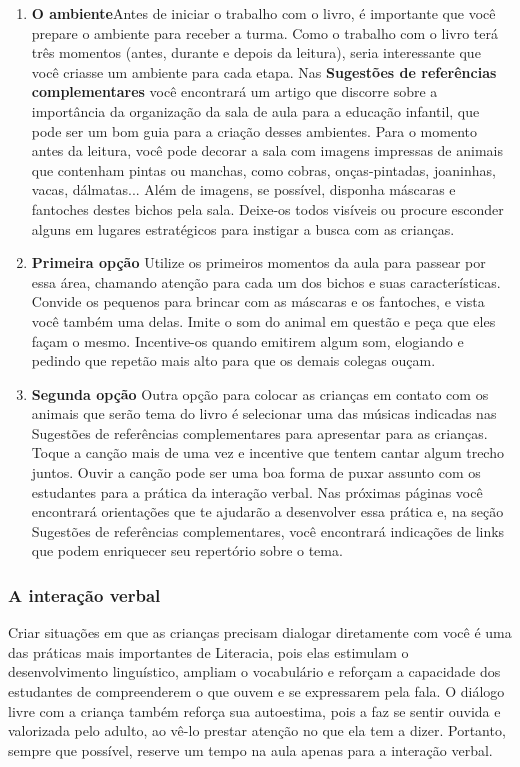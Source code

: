 \documentclass[11pt]{extarticle}
\begin{document}
\begin{enumerate}
\item \textbf{O ambiente}\quad Antes de iniciar o trabalho com o livro, é importante que você 
prepare o ambiente para receber a turma. Como o trabalho com o livro terá 
três momentos (antes, durante e depois da leitura), seria interessante que você 
criasse um ambiente para cada etapa. Nas \textbf{Sugestões de referências complementares} 
você encontrará um artigo que discorre sobre a importância da organização da sala 
de aula para a educação infantil, que pode ser um bom guia para a criação desses 
ambientes. Para o momento antes da leitura, você pode decorar a sala com imagens 
impressas de animais que contenham pintas ou manchas, como cobras, onças-pintadas,
joaninhas, vacas, dálmatas... Além de imagens, se possível, disponha máscaras
e fantoches destes bichos pela sala. Deixe-os todos visíveis ou procure
esconder alguns em lugares estratégicos para instigar a busca com as crianças.


\item \textbf{Primeira opção}\quad 
Utilize os primeiros 
momentos da aula para passear por essa área, chamando atenção para cada um 
dos bichos e suas características. Convide os pequenos para brincar com 
as máscaras e os fantoches, e vista você também uma delas. Imite o som do
animal em questão e peça que eles façam o mesmo. Incentive-os quando
emitirem algum som, elogiando e pedindo que repetão mais alto para que 
os demais colegas ouçam.

\item \textbf{Segunda opção}\quad 
Outra opção para colocar 
as crianças em contato com os animais que serão tema do livro é selecionar 
uma das músicas indicadas nas Sugestões de referências complementares para 
apresentar para as crianças. Toque a canção mais de uma vez e incentive que 
tentem cantar algum trecho juntos. Ouvir a canção pode ser uma boa forma de 
puxar assunto com os estudantes para a prática da interação verbal. Nas próximas 
páginas você encontrará orientações que te ajudarão a desenvolver essa prática e, 
na seção Sugestões de referências complementares, você encontrará indicações 
de links que podem enriquecer seu repertório sobre o tema.
\end{enumerate}


\subsubsection{A interação verbal} 
Criar situações em que as crianças precisam dialogar diretamente com 
você é uma das práticas mais importantes de Literacia, pois elas estimulam 
o desenvolvimento linguístico, ampliam o vocabulário e reforçam a 
capacidade dos estudantes de compreenderem o que ouvem e se expressarem 
pela fala. O diálogo livre com a criança também reforça sua autoestima, pois 
a faz se sentir ouvida e valorizada pelo adulto, ao vê-lo prestar atenção 
no que ela tem a dizer. Portanto, sempre que possível, reserve um tempo na 
aula apenas para a interação verbal. 
\end{document}
